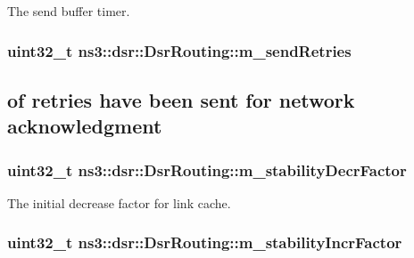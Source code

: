 The send buffer timer. 

\subsubsection[{\texorpdfstring{m\+\_\+send\+Retries}{m_sendRetries}}]{\setlength{\rightskip}{0pt plus 5cm}uint32\+\_\+t ns3\+::dsr\+::\+Dsr\+Routing\+::m\+\_\+send\+Retries\hspace{0.3cm}{\ttfamily [private]}}\hypertarget{classns3_1_1dsr_1_1DsrRouting_a02a55fe3b490af4dbd62953065d293a3}{}\label{classns3_1_1dsr_1_1DsrRouting_a02a55fe3b490af4dbd62953065d293a3}


\subsection*{of retries have been sent for network acknowledgment}

\subsubsection[{\texorpdfstring{m\+\_\+stability\+Decr\+Factor}{m_stabilityDecrFactor}}]{\setlength{\rightskip}{0pt plus 5cm}uint32\+\_\+t ns3\+::dsr\+::\+Dsr\+Routing\+::m\+\_\+stability\+Decr\+Factor\hspace{0.3cm}{\ttfamily [private]}}\hypertarget{classns3_1_1dsr_1_1DsrRouting_a4a6db69db44738ae07289fa0993ac916}{}\label{classns3_1_1dsr_1_1DsrRouting_a4a6db69db44738ae07289fa0993ac916}


The initial decrease factor for link cache. 

\subsubsection[{\texorpdfstring{m\+\_\+stability\+Incr\+Factor}{m_stabilityIncrFactor}}]{\setlength{\rightskip}{0pt plus 5cm}uint32\+\_\+t ns3\+::dsr\+::\+Dsr\+Routing\+::m\+\_\+stability\+Incr\+Factor\hspace{0.3cm}{\ttfamily [private]}}\hypertarget{classns3_1_1dsr_1_1DsrRouting_a9c6b73944ece2adc5f06b5010d9e55f2}{}\label{classns3_1_1dsr_1_1DsrRouting_a9c6b73944ece2adc5f06b5010d9e55f2}


